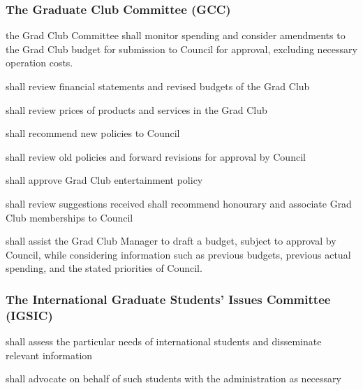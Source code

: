 \subsubsection{The Graduate Club Committee (GCC)}
\begin{longenum}[ label*=\thesubsubsection.\arabic*., align=left]
	\item the Grad Club Committee shall monitor spending and consider amendments to the Grad Club budget for submission to Council for approval, excluding necessary operation costs.
    \item shall review financial statements and revised budgets of the Grad Club
    \item shall review prices of products and services in the Grad Club
    \item shall recommend new policies to Council
    \item shall review old policies and forward revisions for approval by Council
    \item shall approve Grad Club entertainment policy
    \item shall review suggestions received shall recommend honourary and associate Grad Club memberships to Council
    \item shall assist the Grad Club Manager to draft a budget, subject to approval by Council, while considering information such as previous budgets, previous actual spending, and the stated priorities of Council.
\end{longenum}

\subsubsection{The International Graduate Students' Issues Committee (IGSIC)}
\begin{longenum}[ label*=\thesubsubsection.\arabic*., align=left]
    \item shall assess  the particular needs of international students and disseminate relevant information
    \item shall advocate on behalf of such students with the administration as necessary
\end{longenum}

